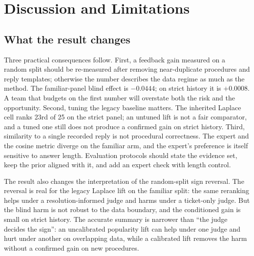 \section{Discussion and Limitations}
\label{sec:discussion}

\subsection{What the result changes}
Three practical consequences follow. First, a feedback gain measured on a random
split should be re-measured after removing near-duplicate procedures and reply
templates; otherwise the number describes the data regime as much as the method.
The familiar-panel blind effect is $-0.0444$; on strict history it is $+0.0008$.
A team that budgets on the first number will overstate both the risk and the
opportunity. Second, tuning the legacy baseline matters. The inherited Laplace cell
ranks 23rd of 25 on the strict panel; an untuned lift is not a fair comparator, and
a tuned one still does not produce a confirmed gain on strict history. Third,
similarity to a single recorded reply is not procedural correctness. The expert and
the cosine metric diverge on the familiar arm, and the expert's preference is
itself sensitive to answer length. Evaluation protocols should state the evidence
set, keep the prior aligned with it, and add an expert check with length control.

The result also changes the interpretation of the random-split sign reversal. The
reversal is real for the legacy Laplace lift on the familiar split: the same
reranking helps under a resolution-informed judge and harms under a ticket-only
judge. But the blind harm is not robust to the data boundary, and the conditioned
gain is small on strict history. The accurate summary is narrower than ``the judge
decides the sign'': an uncalibrated popularity lift can help under one judge and
hurt under another on overlapping data, while a calibrated lift removes the harm
without a confirmed gain on new procedures.

